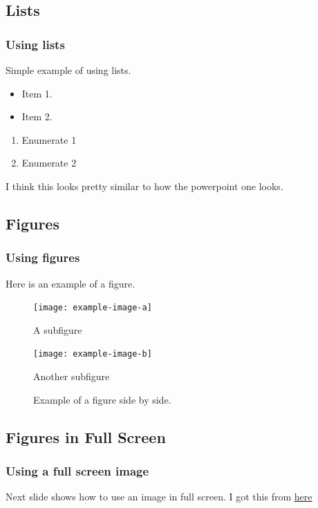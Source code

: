 \documentclass[
	10pt, %
	aspectratio=169, %
]{beamer}
\begin{document}
\subsection{Lists}
\begin{frame}
	\frametitle{Using lists}
	Simple example of using lists.
	\begin{itemize}
		\item Item 1.
		\item Item 2.
	\end{itemize}

	\begin{enumerate}
		\setlength{\leftmargini}{12pt}
		\item Enumerate 1
		\item Enumerate 2
	\end{enumerate}
	I think this looks pretty similar to how the powerpoint one looks.
\end{frame}

\subsection{Figures}
\begin{frame}
	\frametitle{Using figures}
	Here is an example of a figure.
	\begin{figure}
		\centering
		\begin{minipage}{.5\textwidth}
			\centering
			\texttt{[image: example-image-a]}
			\caption{A subfigure}
		\end{minipage}%
		\begin{minipage}{.5\textwidth}
			\centering
			\texttt{[image: example-image-b]}
			\caption{Another subfigure}
		\end{minipage}
		\caption{Example of a figure side by side.}
	\end{figure}
\end{frame}

\subsection{Figures in Full Screen}
\begin{frame}
	\frametitle{Using a full screen image}
	Next slide shows how to use an image in full screen.
	I got this from
	\href{
		https://tex.stackexchange.com/questions/3915/image-on-full-slide-in-beamer-package
	}{\color{RPIred}\underline{here}}
\end{frame}

{
\begin{frame}[plain]
\end{frame}
}
\end{document}
